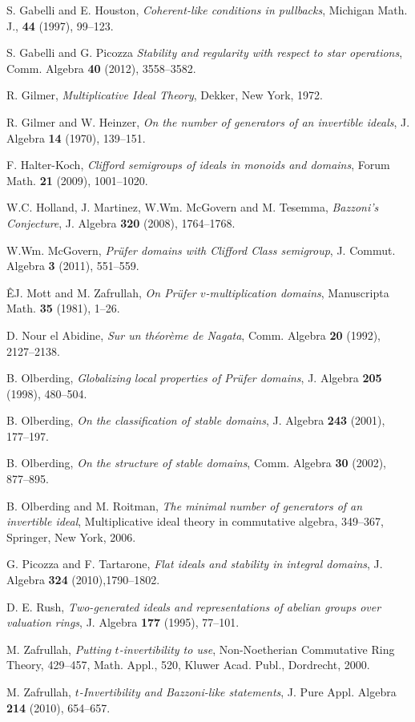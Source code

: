 \documentclass[12pt]{amsart}
\theoremstyle{definition}
\begin{document}
\begin{thebibliography}{9}
 S. Gabelli and E. Houston, \emph{Coherent-like conditions in pullbacks}, Michigan Math. J., {\bf 44} (1997), 99--123.

 S. Gabelli and G. Picozza \emph{Stability and regularity with respect to star operations}, Comm. Algebra {\bf 40} (2012), 3558--3582.

 R. Gilmer,  \emph{Multiplicative Ideal Theory}, Dekker, New  York, 1972.  

 R. Gilmer and W. Heinzer, \emph{On the number of generators of an invertible ideals}, J. Algebra {\bf 14} (1970), 139--151.

 F. Halter-Koch, \emph{Clifford semigroups of ideals in monoids and domains}, Forum Math. {\bf 21} (2009), 1001--1020.

 W.C. Holland, J. Martinez, W.Wm. McGovern and M. Tesemma, \emph{Bazzoni's Conjecture}, J. Algebra {\bf 320} (2008), 1764--1768.

 W.Wm. McGovern, \emph{Pr\"ufer domains with Clifford Class semigroup},  J. Commut. Algebra \textbf{3} (2011),  551--559.

ÊJ. Mott and M.  Zafrullah, \emph{On Pr\"ufer $v$-multiplication domains}, Manuscripta Math. {\bf 35} (1981), 1--26.

 D. Nour el Abidine, \emph{Sur un th\'eor\`eme de Nagata}, Comm. Algebra {\bf 20} (1992), 2127--2138.

 B. Olberding,  \emph{Globalizing local properties of Pr\"ufer domains}, J. Algebra \textbf{205} (1998), 480--504.

  B. Olberding, \emph{On the classification of stable domains},
J. Algebra \textbf{243} (2001), 177--197.

 B. Olberding, \emph{On the structure of stable domains}, Comm.
Algebra \textbf{30} (2002), 877--895.

 B. Olberding and M. Roitman, \emph{The minimal number of generators of an invertible ideal}, Multiplicative ideal theory in commutative algebra, 349--367, Springer, New York, 2006.

 G. Picozza and F. Tartarone, \emph{Flat ideals and stability in integral domains}, J. Algebra \textbf{324} (2010),1790--1802. 

 D. E. Rush, \emph{Two-generated ideals and representations of abelian groups over valuation rings}, J. Algebra  {\bf 177}  (1995), 77--101.

  M. Zafrullah, {\it Putting $t$-invertibility to use}, Non-Noetherian Commutative Ring Theory, 429--457, Math. Appl., 520,  Kluwer Acad. Publ., Dordrecht, 2000.

 M. Zafrullah, \emph{$t$-Invertibility and Bazzoni-like statements}, J. Pure Appl. Algebra {\bf 214} (2010), 654--657.

\end{thebibliography}
\end{document}
